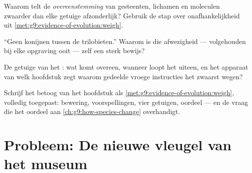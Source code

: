 \begin{exercise}[$\star\star$]\label{exo:g9:evidence-of-evolution:9}
Waarom telt de \emph{overeenstemming} van gesteenten, lichamen en
moleculen zwaarder dan elke getuige afzonderlijk? Gebruik de stap
over onafhankelijkheid uit
\cref{met:g9:evidence-of-evolution:weigh}.
\end{exercise}

\begin{exercise}[$\star\star$]\label{exo:g9:evidence-of-evolution:10}
``Geen konijnen tussen de trilobieten.'' Waarom is die afwezigheid
--- volgehouden bij elke opgraving ooit --- zelf een sterk
bewijs?
\end{exercise}

\begin{exercise}[$\star\star$]\label{exo:g9:evidence-of-evolution:11}
De getuige van het : wat komt overeen, wanneer loopt het
uiteen, en het apparaat van welk hoofdstuk zegt waarom gedeelde
vroege instructies het zwaarst wegen?
\end{exercise}

\begin{exercise}[$\star\star\star$]\label{exo:g9:evidence-of-evolution:12}
Schrijf het betoog van het hoofdstuk als
\cref{met:g9:evidence-of-evolution:weigh}, volledig toegepast:
bewering, voorspellingen, vier getuigen, oordeel --- en de vraag
die het oordeel aan
\cref{ch:g9:how-species-change} overhandigt.
\end{exercise}

\section{Probleem: De nieuwe vleugel van het museum}


